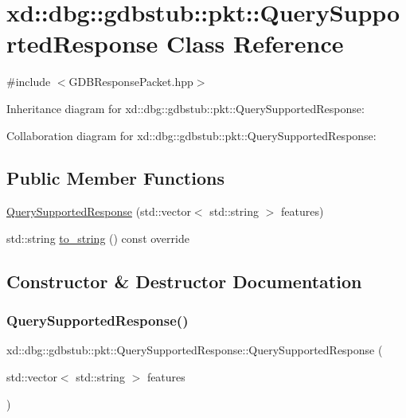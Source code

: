 \hypertarget{classxd_1_1dbg_1_1gdbstub_1_1pkt_1_1_query_supported_response}{}\section{xd\+:\+:dbg\+:\+:gdbstub\+:\+:pkt\+:\+:Query\+Supported\+Response Class Reference}
\label{classxd_1_1dbg_1_1gdbstub_1_1pkt_1_1_query_supported_response}


{\ttfamily \#include $<$G\+D\+B\+Response\+Packet.\+hpp$>$}



Inheritance diagram for xd\+:\+:dbg\+:\+:gdbstub\+:\+:pkt\+:\+:Query\+Supported\+Response\+:


Collaboration diagram for xd\+:\+:dbg\+:\+:gdbstub\+:\+:pkt\+:\+:Query\+Supported\+Response\+:
\subsection*{Public Member Functions}
\begin{DoxyCompactItemize}
\item 
\mbox{\hyperlink{classxd_1_1dbg_1_1gdbstub_1_1pkt_1_1_query_supported_response_a252c9cb08bc846e408385a6ad7c9d9d9}{Query\+Supported\+Response}} (std\+::vector$<$ std\+::string $>$ features)
\item 
std\+::string \mbox{\hyperlink{classxd_1_1dbg_1_1gdbstub_1_1pkt_1_1_query_supported_response_a31faab3ddafc47625129ae445fbc1b1e}{to\+\_\+string}} () const override
\end{DoxyCompactItemize}


\subsection{Constructor \& Destructor Documentation}
\mbox{\label{classxd_1_1dbg_1_1gdbstub_1_1pkt_1_1_query_supported_response_a252c9cb08bc846e408385a6ad7c9d9d9}} 
\subsubsection{\texorpdfstring{Query\+Supported\+Response()}{QuerySupportedResponse()}}
{\footnotesize\ttfamily xd\+::dbg\+::gdbstub\+::pkt\+::\+Query\+Supported\+Response\+::\+Query\+Supported\+Response (\begin{DoxyParamCaption}\item[{std\+::vector$<$ std\+::string $>$}]{features }\end{DoxyParamCaption})\hspace{0.3cm}{\ttfamily [inline]}}



